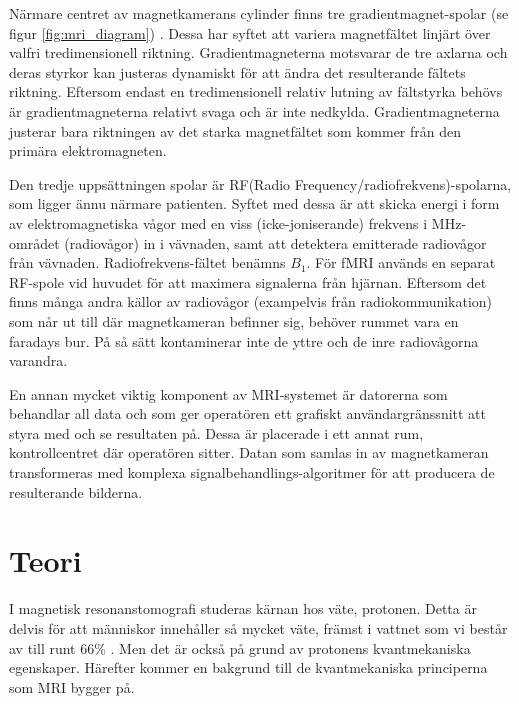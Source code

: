 \documentclass[11pt, a4paper]{article}
\begin{document}
Närmare centret av magnetkamerans cylinder finns tre gradient\-magnet-spolar (se figur \ref{fig:mri_diagram}) \parencite{understanding_mri}. Dessa har syftet att variera magnetfältet linjärt över valfri tredimensionell riktning. Gradientmagneterna motsvarar de tre axlarna och deras styrkor kan justeras dynamiskt för att ändra det resulterande fältets riktning. Eftersom endast en tredimensionell relativ lutning av fältstyrka behövs är gradientmagneterna relativt svaga och är inte nedkylda. Gradientmagneterna justerar bara riktningen av det starka magnetfältet som kommer från den primära elektromagneten.

Den tredje uppsättningen spolar är RF(Radio Frequency/radiofrekvens)-spolarna, som ligger ännu närmare patienten. Syftet med dessa är att skicka energi i form av elektromagnetiska vågor med en viss (icke-joniserande) frekvens i MHz-området (radiovågor) in i vävnaden, samt att detektera emitterade radiovågor från vävnaden. Radiofrekvens-fältet benämns $B_1$. För fMRI används en separat RF-spole vid huvudet för att maximera signalerna från hjärnan. Eftersom det finns många andra källor av radiovågor (exampelvis från radio\-kommunikation) som når ut till där magnetkameran befinner sig, behöver rummet vara en faradays bur. På så sätt kontaminerar inte de yttre och de inre radiovågorna varandra.

En annan mycket viktig komponent av MRI-systemet är datorerna som behandlar all data och som ger operatören ett grafiskt användargränssnitt att styra med och se resultaten på. Dessa är placerade i ett annat rum, kontrollcentret där operatören sitter. Datan som samlas in av magnetkameran transformeras med komplexa signalbehandlings-algoritmer för att producera de resulterande bilderna.

\clearpage
\section{Teori}


I magnetisk resonanstomografi studeras kärnan hos väte, protonen. Detta är delvis för att människor innehåller så mycket väte, främst i vattnet som vi består av till runt 66\% \parencite{mri_nobelpris_pressmeddelande}. Men det är också på grund av protonens kvantmekaniska egenskaper. Härefter kommer en bakgrund till de kvantmekaniska principerna som MRI bygger på.
\end{document}
